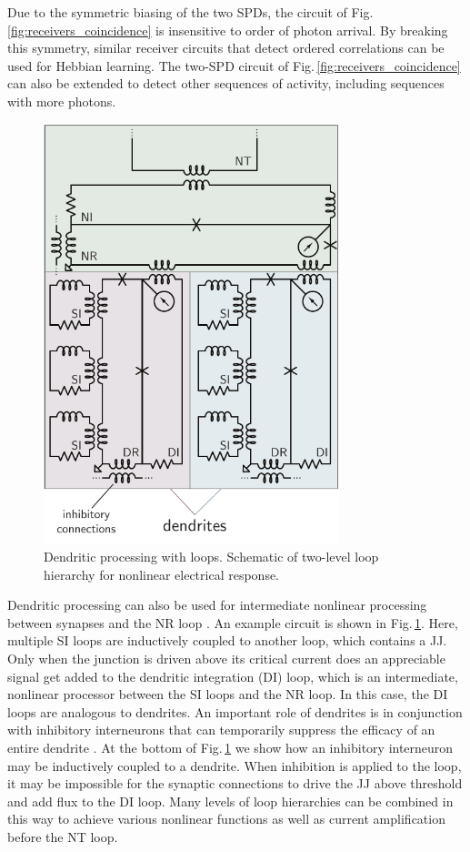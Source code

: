 \documentclass[twocolumn]{article}
\begin{document}
Due to the symmetric biasing of the two SPDs, the circuit of Fig.\,\ref{fig:receivers_coincidence} is insensitive to order of photon arrival. By breaking this symmetry, similar receiver circuits that detect ordered correlations can be used for Hebbian learning. The two-SPD circuit of Fig.\,\ref{fig:receivers_coincidence} can also be extended to detect other sequences of activity, including sequences with more photons. 
\begin{figure}[t!]
	\centerline{\includegraphics[width=8.6cm]{_receivers_dendriticProcessing_small.pdf}}
	\caption{\label{fig:receivers_dendriticProcessing} Dendritic processing with loops. Schematic of two-level loop hierarchy for nonlinear electrical response.}
\end{figure}

Dendritic processing can also be used for intermediate nonlinear processing between synapses and the NR loop \cite{sava2017}. An example circuit is shown in Fig.\,\ref{fig:receivers_dendriticProcessing}. Here, multiple SI loops are inductively coupled to another loop, which contains a JJ. Only when the junction is driven above its critical current does an appreciable signal get added to the dendritic integration (DI) loop, which is an intermediate, nonlinear processor between the SI loops and the NR loop. In this case, the DI loops are analogous to dendrites. An important role of dendrites is in conjunction with inhibitory interneurons that can temporarily suppress the efficacy of an entire dendrite \cite{budr2004,bu2006,robu2015}. At the bottom of Fig.\,\ref{fig:receivers_dendriticProcessing} we show how an inhibitory interneuron may be inductively coupled to a dendrite. When inhibition is applied to the loop, it may be impossible for the synaptic connections to drive the JJ above threshold and add flux to the DI loop. Many levels of loop hierarchies can be combined in this way to achieve various nonlinear functions as well as current amplification before the NT loop.
\end{document}

